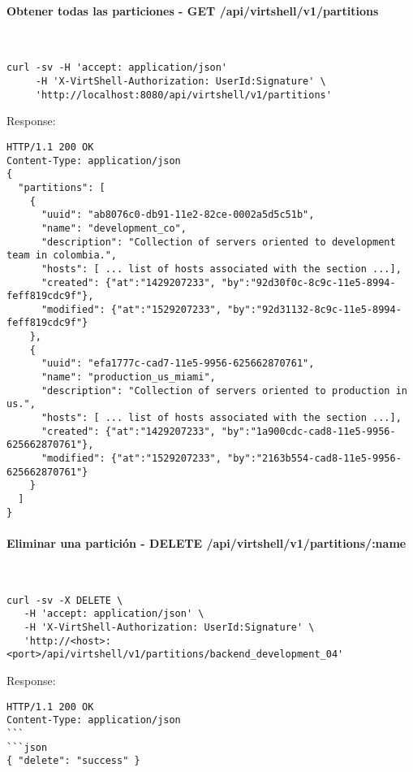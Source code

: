 \paragraph{Obtener todas las particiones - GET /api/virtshell/v1/partitions} ~\\

\begin{lstlisting}[style=json]
curl -sv -H 'accept: application/json' 
     -H 'X-VirtShell-Authorization: UserId:Signature' \ 
     'http://localhost:8080/api/virtshell/v1/partitions'
\end{lstlisting}

Response:

\begin{lstlisting}[style=json]
HTTP/1.1 200 OK
Content-Type: application/json
{
  "partitions": [
    {
      "uuid": "ab8076c0-db91-11e2-82ce-0002a5d5c51b",
      "name": "development_co",
      "description": "Collection of servers oriented to development team in colombia.",
      "hosts": [ ... list of hosts associated with the section ...],
      "created": {"at":"1429207233", "by":"92d30f0c-8c9c-11e5-8994-feff819cdc9f"},
      "modified": {"at":"1529207233", "by":"92d31132-8c9c-11e5-8994-feff819cdc9f"}
    },
    { 
      "uuid": "efa1777c-cad7-11e5-9956-625662870761",
      "name": "production_us_miami",
      "description": "Collection of servers oriented to production in us.",
      "hosts": [ ... list of hosts associated with the section ...],      
      "created": {"at":"1429207233", "by":"1a900cdc-cad8-11e5-9956-625662870761"},
      "modified": {"at":"1529207233", "by":"2163b554-cad8-11e5-9956-625662870761"}
    }    
  ]
}  
\end{lstlisting}

\paragraph{Eliminar una partición - DELETE /api/virtshell/v1/partitions/:name} ~\\

\begin{lstlisting}[style=json]
curl -sv -X DELETE \
   -H 'accept: application/json' \
   -H 'X-VirtShell-Authorization: UserId:Signature' \
   'http://<host>:<port>/api/virtshell/v1/partitions/backend_development_04'
\end{lstlisting}

Response:

\begin{lstlisting}[style=json]
HTTP/1.1 200 OK
Content-Type: application/json
```
```json
{ "delete": "success" }
\end{lstlisting}

